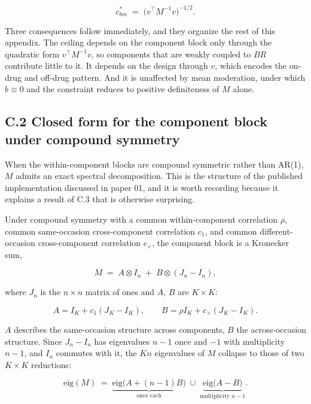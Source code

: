 \documentclass[
  11pt,
]{article}
\begin{document}
\begin{equation}
c_{bm}^{\ast} \;=\; \bigl(v^{\top} M^{-1} v\bigr)^{-1/2}.
\label{eq:ceiling}
\end{equation}

Three consequences follow immediately, and they organize the rest of
this appendix. The ceiling depends on the component block only
through the quadratic form \(v^{\top} M^{-1} v\), so components that
are weakly coupled to \(BR\) contribute little to it. It depends on the
design through \(v\), which encodes the on-drug and off-drug pattern.
And it is unaffected by mean moderation, under which \(b \equiv 0\) and
the constraint reduces to positive definiteness of \(M\) alone.

\subsection{C.2 Closed form for the component block under compound
symmetry}

When the within-component blocks are compound symmetric rather than
AR(1), \(M\) admits an exact spectral decomposition. This is the
structure of the published implementation discussed in paper 01, and
it is worth recording because it explains a result of C.3 that is
otherwise surprising.

Under compound symmetry with a common within-component correlation
\(\rho\), common same-occasion cross-component correlation \(c_1\), and
common different-occasion cross-component correlation \(c_{\times}\),
the component block is a Kronecker sum,

\begin{equation}
M \;=\; A \otimes I_n \;+\; B \otimes (J_n - I_n),
\label{eq:kron}
\end{equation}

where \(J_n\) is the \(n \times n\) matrix of ones and \(A\), \(B\) are
\(K \times K\):

\[
A = I_K + c_1 (J_K - I_K), \qquad
B = \rho I_K + c_{\times}(J_K - I_K).
\]

\(A\) describes the same-occasion structure across components, \(B\) the
across-occasion structure. Since \(J_n - I_n\) has eigenvalues \(n-1\)
once and \(-1\) with multiplicity \(n-1\), and \(I_n\) commutes with it,
the \(Kn\) eigenvalues of \(M\) collapse to those of two \(K \times K\)
reductions:

\[
\mathrm{eig}(M) \;=\;
\underbrace{\mathrm{eig}\bigl(A + (n-1)B\bigr)}_{\text{once each}}
\;\cup\;
\underbrace{\mathrm{eig}\bigl(A - B\bigr)}_{\text{multiplicity } n-1}.
\]
\end{document}
